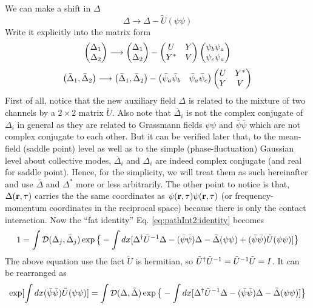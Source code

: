 We can make a shift in $\Delta$
\begin{equation}\label{eq:pathInt2:DeltaPhi}
\Delta\longrightarrow\Delta-\tilde{U}(\psi\psi)
\end{equation}
Write it explicitly into the matrix form
\begin{equation*}
\begin{pmatrix}\Delta_{1}\\\Delta_{2}\end{pmatrix}\longrightarrow
	\begin{pmatrix}\Delta_{1}\\\Delta_{2}\end{pmatrix}-
	\begin{pmatrix}U&Y\\Y^{*}&V\end{pmatrix}
	\begin{pmatrix}\psi_{b}\psi_{a}\\\psi_{c}\psi_{a}\end{pmatrix}
\end{equation*}
\begin{equation*}
\begin{pmatrix}\bar\Delta_{1},\bar\Delta_{2}\end{pmatrix}\longrightarrow
	\begin{pmatrix}\bar\Delta_{1},\bar\Delta_{2}\end{pmatrix}-
	\begin{pmatrix}\bar\psi_{a}\bar\psi_{b}&\bar\psi_{a}\bar\psi_{c}\end{pmatrix}
	\begin{pmatrix}U&Y^{*}\\Y^{}&V\end{pmatrix}
\end{equation*}
First of all, notice that the new auxiliary field $\Delta$ is related to the mixture of two channels by a $2\times2$ matrix $\tilde{U}$.
Also note that  $\bar{\Delta}_{i}$ is not the complex conjugate of $\Delta_{i}$ in general as they are related to Grassmann fields $\psi\psi$ and $\bar\psi\bar\psi$ which are not complex conjugate to each other. But it can be verified later that, to the  mean-field (saddle point) level as well as to the simple  (phase-fluctuation) Gaussian level about collective modes, $\bar{\Delta}_{i}$ and ${\Delta}_{i}$ are indeed complex conjugate (and real for saddle point).  Hence, for the simplicity, we will treat them as such hereinafter and use $\bar\Delta$ and $\Delta^{*}$ more or less arbitrarily.  The other point to notice is that, $\Delta(\mathbf{r},\tau)$ carries the the same coordinates as $\psi(\mathbf{r},\tau)\psi(\mathbf{r},\tau)$ (or frequency-momentum coordinates in the reciprocal space) because there is only the contact interaction.  Now the ``fat identity'' Eq. \ref{eq:pathInt2:identity} becomes 
\begin{equation}
1=\int{\ensuremath{\mathcal{D}}(\Delta_{j},\bar\Delta_{j})}\exp\big\{-\int{dx}
	[\Delta^{\dagger}\tilde{U}^{-1}\Delta-(\bar\psi\bar\psi)\Delta-\bar\Delta(\psi\psi)+(\bar\psi\bar\psi)\tilde{U}(\psi\psi)]\big\}
\end{equation}
The above equation use the fact $\tilde{U}$ is hermitian, so $\tilde{U}^{\dagger}\tilde{U}^{-1}=\tilde{U}^{-1}\tilde{U}=I$.
It can be rearranged as 
\begin{equation}
\exp[\int{dx}(\bar\psi\bar\psi)\tilde{U}(\psi\psi)]
=\int{\ensuremath{\mathcal{D}}(\Delta,\bar\Delta)}\exp\big\{-\int{dx}
	[\Delta^{\dagger}\tilde{U}^{-1}\Delta-(\bar\psi\bar\psi)\Delta-\bar\Delta{}(\psi\psi)]\big\}
\end{equation}
